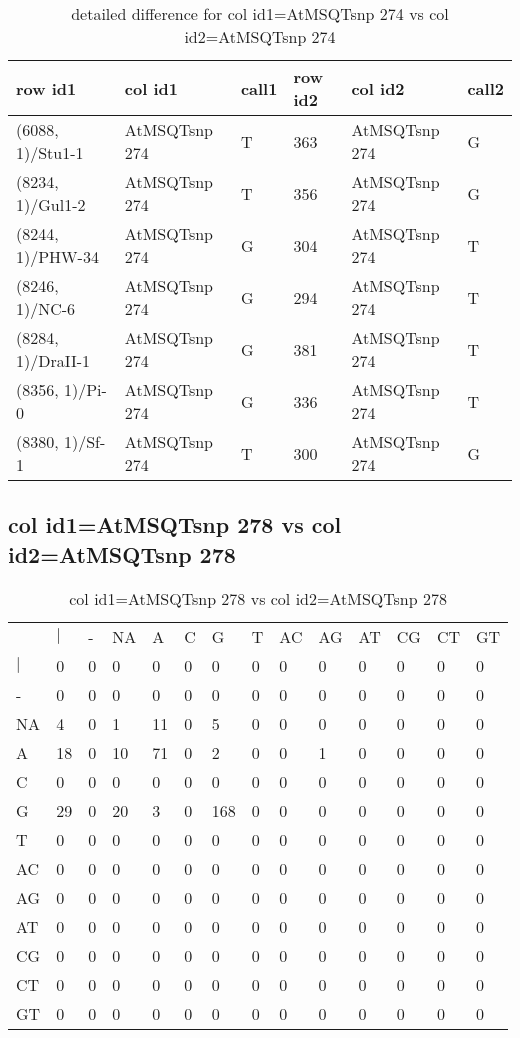 \begin{center}
\begin{longtable}{|l|l|l|l|l|l|}
\caption{detailed difference for col id1=AtMSQTsnp 274 vs col id2=AtMSQTsnp 274} \label{table_dm817}\\
\hline
row id1&col id1&call1&row id2&col id2&call2\\
\hline
(6088, 1)/Stu1-1&AtMSQTsnp 274&T&363&AtMSQTsnp 274&G\\
(8234, 1)/Gul1-2&AtMSQTsnp 274&T&356&AtMSQTsnp 274&G\\
(8244, 1)/PHW-34&AtMSQTsnp 274&G&304&AtMSQTsnp 274&T\\
(8246, 1)/NC-6&AtMSQTsnp 274&G&294&AtMSQTsnp 274&T\\
(8284, 1)/DraII-1&AtMSQTsnp 274&G&381&AtMSQTsnp 274&T\\
(8356, 1)/Pi-0&AtMSQTsnp 274&G&336&AtMSQTsnp 274&T\\
(8380, 1)/Sf-1&AtMSQTsnp 274&T&300&AtMSQTsnp 274&G\\
\hline
\end{longtable}
\end{center}

\subsection{col id1=AtMSQTsnp 278 vs col id2=AtMSQTsnp 278}
\begin{center}
\begin{longtable}{|l|l|l|l|l|l|l|l|l|l|l|l|l|l|}
\caption{col id1=AtMSQTsnp 278 vs col id2=AtMSQTsnp 278} \label{table_dm818}\\
\hline
\\
\hline
&$|$&-&NA&A&C&G&T&AC&AG&AT&CG&CT&GT\\
$|$&0&0&0&0&0&0&0&0&0&0&0&0&0\\
-&0&0&0&0&0&0&0&0&0&0&0&0&0\\
NA&4&0&1&11&0&5&0&0&0&0&0&0&0\\
A&18&0&10&71&0&2&0&0&1&0&0&0&0\\
C&0&0&0&0&0&0&0&0&0&0&0&0&0\\
G&29&0&20&3&0&168&0&0&0&0&0&0&0\\
T&0&0&0&0&0&0&0&0&0&0&0&0&0\\
AC&0&0&0&0&0&0&0&0&0&0&0&0&0\\
AG&0&0&0&0&0&0&0&0&0&0&0&0&0\\
AT&0&0&0&0&0&0&0&0&0&0&0&0&0\\
CG&0&0&0&0&0&0&0&0&0&0&0&0&0\\
CT&0&0&0&0&0&0&0&0&0&0&0&0&0\\
GT&0&0&0&0&0&0&0&0&0&0&0&0&0\\
\hline
\end{longtable}
\end{center}

